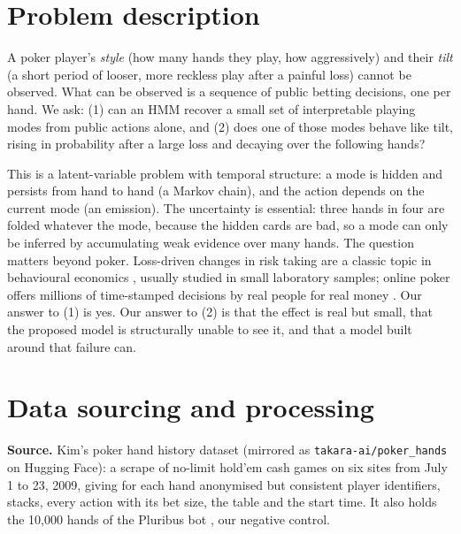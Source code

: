 \begin{abstract}
Can a hidden Markov model recover playing styles from public betting actions in online poker, and does one of its states behave like \emph{tilt}, a spell of looser play after a painful loss? On 2.6 million real six-handed no-limit hold'em hands we fit HMMs with our own NumPy implementation of Baum--Welch, forward--backward and Viterbi. A four-state HMM recovers four interpretable styles (held-out players in its loose-passive state lose 7.2 big blinds per 100 hands), but they are traits, not moods: 88\% of sessions never change state. Tilt is in the raw data as a small shift (1.0 point more pots entered after a big loss than after a big win), and this HMM cannot see it. \tiltsummary
\end{abstract}

\section{Problem description}
A poker player's \emph{style} (how many hands they play, how aggressively) and their \emph{tilt} (a short period of looser, more reckless play after a painful loss) cannot be observed. What can be observed is a sequence of public betting decisions, one per hand. We ask: (1) can an HMM recover a small set of interpretable playing modes from public actions alone, and (2) does one of those modes behave like tilt, rising in probability after a large loss and decaying over the following hands?

This is a latent-variable problem with temporal structure: a mode is hidden and persists from hand to hand (a Markov chain), and the action depends on the current mode (an emission). The uncertainty is essential: three hands in four are folded whatever the mode, because the hidden cards are bad, so a mode can only be inferred by accumulating weak evidence over many hands. The question matters beyond poker. Loss-driven changes in risk taking are a classic topic in behavioural economics \cite{thaler1990}, usually studied in small laboratory samples; online poker offers millions of time-stamped decisions by real people for real money \cite{smith2009,eil2014}. Our answer to (1) is yes. Our answer to (2) is that the effect is real but small, that the proposed model is structurally unable to see it, and that a model built around that failure can.

\section{Data sourcing and processing}
\textbf{Source.} Kim's poker hand history dataset \cite{kim2024,kim2025} (mirrored as \texttt{takara-ai/poker\_hands} on Hugging Face): a scrape of no-limit hold'em cash games on six sites from July 1 to 23, 2009, giving for each hand anonymised but consistent player identifiers, stacks, every action with its bet size, the table and the start time. It also holds the 10{,}000 hands of the Pluribus bot \cite{brown2019}, our negative control.

